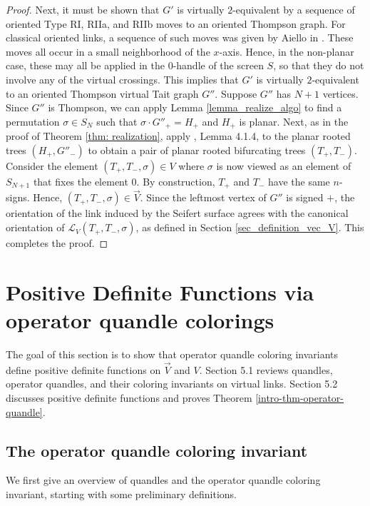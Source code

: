 \documentclass[11pt, twoside]{amsart}
\numberwithin{equation}{section}
\theoremstyle{definition}
\numberwithin{equation}{section}
\begin{document}
\begin{proof}
Next, it must be shown that $G'$ is virtually $2$-equivalent by a sequence of oriented Type RI, RIIa, and RIIb moves to an oriented Thompson graph. For classical oriented links, a sequence of such moves was given by Aiello in \cite{aiello_oriented}. These moves all occur in a small neighborhood of the $x$-axis. Hence, in the non-planar case, these may all be applied in the $0$-handle of the screen $S$, so that they do not involve any of the virtual crossings. This implies that $G'$ is virtually $2$-equivalent to an oriented Thompson virtual Tait graph $G''$. Suppose $G''$ has $N+1$ vertices. Since $G''$ is Thompson, we can apply Lemma \ref{lemma_realize_algo} to find a permutation $\sigma \in S_N$ such that $\sigma \cdot G''_+=H_+$ and $H_+$ is planar. Next, as in the proof of Theorem \ref{thm: realization}, apply \cite{jones_unitary}, Lemma 4.1.4, to the planar rooted trees  $(H_+,G''_-)$ to obtain a pair of planar rooted bifurcating trees $(T_+,T_-)$. Consider the element $(T_+,T_-,\sigma) \in V$ where $\sigma$ is now viewed as an element of $S_{N+1}$ that fixes the element $0$. By construction, $T_+$ and $T_-$ have the same $n$-signs. Hence, $(T_+,T_-,\sigma) \in \vec{V}$. Since the leftmost vertex of $G''$ is signed $+$, the orientation of the link induced by the Seifert surface agrees with the canonical orientation of $\mathscr{L}_V(T_+,T_-,\sigma)$, as defined in Section \ref{sec_definition_vec_V}. This completes the proof.  
\end{proof}

\section{Positive Definite Functions via operator quandle colorings}\label{sec: op colorings}

 The goal of this section is to show that operator quandle coloring invariants define positive definite functions on $\vec{V}$ and $V$. Section 5.1 reviews quandles, operator quandles, and their coloring invariants on virtual links. Section 5.2 discusses positive definite functions and proves Theorem \ref{intro-thm-operator-quandle}.

\subsection{The operator quandle coloring invariant}
We first give an overview of quandles and the operator quandle coloring invariant, starting with some preliminary definitions.
\end{document}
